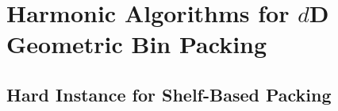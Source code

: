 \chapter{Harmonic Algorithms for \texorpdfstring{$d$}{d}D Geometric Bin Packing}
\label{chap:hdhk}










\begin{optional}
\section{Hard Instance for Shelf-Based Packing}
\label{sec:hard-example}
\end{optional}
